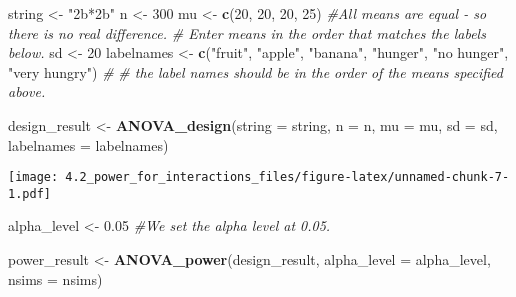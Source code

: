 \documentclass[]{article}
\newenvironment{Shaded}{\begin{snugshade}}{\end{snugshade}}
\newcommand{\KeywordTok}[1]{\textcolor[rgb]{0.13,0.29,0.53}{\textbf{#1}}}
\newcommand{\DataTypeTok}[1]{\textcolor[rgb]{0.13,0.29,0.53}{#1}}
\newcommand{\DecValTok}[1]{\textcolor[rgb]{0.00,0.00,0.81}{#1}}
\newcommand{\FloatTok}[1]{\textcolor[rgb]{0.00,0.00,0.81}{#1}}
\newcommand{\StringTok}[1]{\textcolor[rgb]{0.31,0.60,0.02}{#1}}
\newcommand{\CommentTok}[1]{\textcolor[rgb]{0.56,0.35,0.01}{\textit{#1}}}
\newcommand{\NormalTok}[1]{#1}
\begin{document}
\begin{Shaded}
\begin{Highlighting}[]
\NormalTok{string <-}\StringTok{ "2b*2b"}
\NormalTok{n <-}\StringTok{ }\DecValTok{300}
\NormalTok{mu <-}\StringTok{ }\KeywordTok{c}\NormalTok{(}\DecValTok{20}\NormalTok{, }\DecValTok{20}\NormalTok{, }\DecValTok{20}\NormalTok{, }\DecValTok{25}\NormalTok{) }\CommentTok{#All means are equal - so there is no real difference.}
\CommentTok{# Enter means in the order that matches the labels below.}
\NormalTok{sd <-}\StringTok{ }\DecValTok{20}
\NormalTok{labelnames <-}\StringTok{ }\KeywordTok{c}\NormalTok{(}\StringTok{"fruit"}\NormalTok{, }\StringTok{"apple"}\NormalTok{, }\StringTok{"banana"}\NormalTok{, }\StringTok{"hunger"}\NormalTok{, }\StringTok{"no hunger"}\NormalTok{, }\StringTok{"very hungry"}\NormalTok{) }\CommentTok{#}
\CommentTok{# the label names should be in the order of the means specified above.}

\NormalTok{design_result <-}\StringTok{ }\KeywordTok{ANOVA_design}\NormalTok{(}\DataTypeTok{string =}\NormalTok{ string,}
                   \DataTypeTok{n =}\NormalTok{ n, }
                   \DataTypeTok{mu =}\NormalTok{ mu, }
                   \DataTypeTok{sd =}\NormalTok{ sd, }
                   \DataTypeTok{labelnames =}\NormalTok{ labelnames)}
\end{Highlighting}
\end{Shaded}

\texttt{[image: 4.2\_power\_for\_interactions\_files/figure-latex/unnamed-chunk-7-1.pdf]}

\begin{Shaded}
\begin{Highlighting}[]
\NormalTok{alpha_level <-}\StringTok{ }\FloatTok{0.05} \CommentTok{#We set the alpha level at 0.05. }

\NormalTok{power_result <-}\StringTok{ }\KeywordTok{ANOVA_power}\NormalTok{(design_result, }\DataTypeTok{alpha_level =}\NormalTok{ alpha_level, }\DataTypeTok{nsims =}\NormalTok{ nsims)}
\end{Highlighting}
\end{Shaded}
\end{document}
